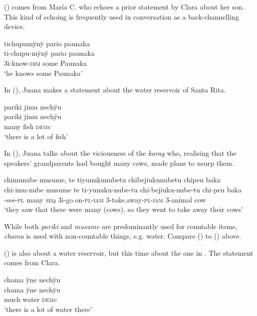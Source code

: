 () comes from María C. who echoes a prior statement by Clara about her son. This kind of echoing is frequently used in conversation as a back-channelling device. 

\ea\label{ex:pario-ex}
\begingl
\glpreamble tichupumÿnÿ pario paunaka\\
\gla ti-chupu-mÿnÿ pario paunaka\\
\glb 3i-know-\textsc{dim} some Paunaka\\
\glft ‘he knows some Paunaka’
\endgl
\trailingcitation{[cux-c120414ls-2.269]}
\xe

In (), Juana makes a statement about the water reservoir of Santa Rita.

\ea\label{ex:pariki-ex}
\begingl
\glpreamble pariki jimu nechÿu\\
\gla pariki jimu nechÿu\\
\glb many fish \textsc{dem}c\\
\glft ‘there is a lot of fish’
\endgl
\trailingcitation{[jxx-p120515l-2.135]}
\xe

In (), Juana talks about the viciousness of the \textit{karay} who, realising that the speakers’ grandparents had bought many cows, made plans to usurp them.

\ea\label{ex:musume-ex}
\begingl
\glpreamble chimunube musume, te tiyunukunubetu chibejiukunubetu chipeu baka\\
\gla chi-imu-nube musume te ti-yunuku-nube-tu chi-bejiuku-nube-tu chi-peu baka\\
-see-\textsc{pl} many \textsc{seq} 3i-go.on-\textsc{pl}-\textsc{iam} 3-take.away-\textsc{pl}-\textsc{iam} 3-animal cow\\
\glft ‘they saw that there were many (cows), so they went to take away their cows’
\endgl
\trailingcitation{[jxx-e150925l-1.258]}%
\xe

While both \textit{pariki} and \textit{musume} are predominantly used for countable items, \textit{chama} is used with non-countable things, e.g. water. Compare () to () above. 

() is also about a water reservoir, but this time about the one in . The statement comes from Clara.

\ea\label{ex:chama-1}
\begingl
\glpreamble chama ÿne nechÿu\\
\gla chama ÿne nechÿu\\
\glb much water \textsc{dem}c\\
\glft ‘there is a lot of water there’
\endgl
\trailingcitation{[cux-c120414ls-1.207]}
\xe


